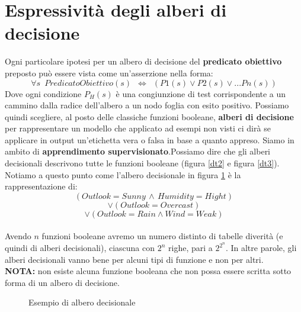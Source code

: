 \section{Espressività degli alberi di decisione}
Ogni particolare ipotesi per un albero di decisione del \textbf{predicato obiettivo} preposto può essere vista come un'asserzione nella forma:
\[\forall s\,\,\, PredicatoObiettivo(s)\,\,\,\iff\,\,\,(P1(s)\vee P2(s)  \vee ... Pn(s))\]
Dove ogni condizione $P_H(s)$ è una congiunzione di test corrispondente a un cammino dalla radice dell'albero a un nodo foglia con esito positivo.
Possiamo quindi scegliere, al posto delle classiche funzioni booleane,
\textbf{alberi di decisione} per rappresentare un modello che applicato ad
esempi non visti ci dirà se applicare in output un'etichetta vera o falsa in
base a quanto appreso. Siamo in ambito di \textbf{apprendimento
  supervisionato}.Possiamo dire che gli alberi decisionali descrivono tutte le funzioni booleane (figura \ref{dt2} e figura \ref{dt3}). 
Notiamo a questo punto come l'albero decisionale in figura \ref{dt} è la
rappresentazione di:
\[(Outlook=Sunny\,\land\, Humidity=Hight)\]
\[\lor(Outlook=Overcast)\]
\[\lor(Outlook=Rain \land Wind=Weak) \] \\ Avendo $n$ funzioni booleane avremo un numero distinto di tabelle diverità (e quindi di alberi decisionali), ciascuna con $2^n$ righe, pari a $2^{2^{n}}$. In altre parole, gli alberi decisionali vanno bene per alcuni tipi di funzione e non per altri.\\
  \textbf{NOTA:} non esiste alcuna funzione booleana che non possa essere scritta sotto forma di un albero di decisione.\\
\begin{figure}
  \centering
  \caption{Esempio di albero decisionale}
  \label{dt}
\end{figure}

